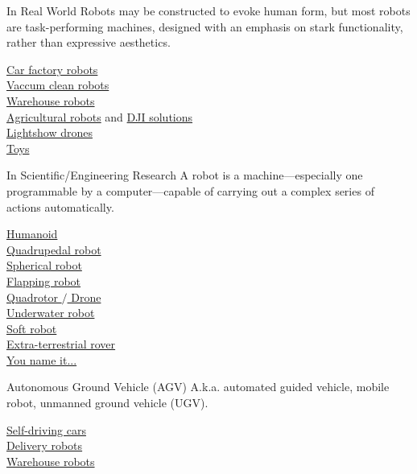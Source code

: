 \documentclass[12pt,letterpaper]{beamer}
\begin{document}
\begin{frame}{In Real World}
    Robots may be constructed to evoke human form, but most robots are task-performing machines, designed with an emphasis on stark functionality, rather than expressive aesthetics. 
    
    \href{https://youtu.be/k1GLwS7CVZs}{Car factory robots} \\
    \href{https://youtu.be/X2pOYXyx6xE}{Vaccum clean robots } \\
    \href{https://youtu.be/IMPbKVb8y8s}{Warehouse robots} \\
    \href{https://youtu.be/8cJ54TWGzMU}{Agricultural robots} and \href{https://youtu.be/hGyLjO7KWeU}{DJI solutions} \\
    \href{https://youtu.be/44KvHwRHb3A}{Lightshow drones} \\
    \href{https://www.amazon.com/dp/B0107H5FJ6/}{Toys}
    
\end{frame}

\begin{frame}{In Scientific/Engineering Research}
    A robot is a machine—especially one programmable by a computer—capable of carrying out a complex series of actions automatically. 
    
    \href{https://youtu.be/tF4DML7FIWk}{Humanoid} \\
    \href{https://youtu.be/9j2a1oAHDL8}{Quadrupedal robot} \\
    \href{https://youtu.be/-q8D7BcLjac}{Spherical robot} \\
    \href{https://youtu.be/hUE8o056Cpc}{Flapping robot} \\
    \href{https://youtu.be/Hebpmadjqn8}{Quadrotor $/$ Drone} \\
    \href{https://youtu.be/4WOOwesIkss}{Underwater robot} \\
    \href{https://youtu.be/qevIIQHrJZg}{Soft robot} \\
    \href{https://youtu.be/5qqsMjy8Rx0}{Extra-terrestrial rover} \\
    \href{https://youtu.be/m-LP4qpOLl0}{You name it...}

\end{frame}

\begin{frame}{Autonomous Ground Vehicle (AGV)}
    A.k.a. automated guided vehicle, mobile robot, unmanned ground vehicle (UGV). 

    \href{https://youtu.be/fmVWLr0X1Sk}{Self-driving cars} \\ 
    \href{https://youtu.be/dagjQW_jgtE}{Delivery robots} \\
    \href{https://youtu.be/IMPbKVb8y8s}{Warehouse robots} 

\end{frame}
\end{document}
